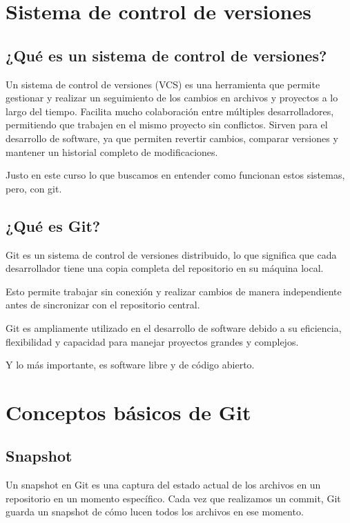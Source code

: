 \documentclass[12pt, letterpaper]{article}
\begin{document}
\section*{Sistema de control de versiones}

\subsection*{¿Qué es un sistema de control de versiones?}

Un sistema de control de versiones (VCS) es una herramienta que permite gestionar y realizar un seguimiento de los cambios en archivos y proyectos a lo largo del tiempo. Facilita mucho colaboración entre múltiples desarrolladores, permitiendo que trabajen en el mismo proyecto sin conflictos. Sirven para el desarrollo de software, ya que permiten revertir cambios, comparar versiones y mantener un historial completo de modificaciones.

Justo en este curso lo que buscamos en entender como funcionan estos sistemas, pero, con git.

\subsection*{¿Qué es Git?}
Git es un sistema de control de versiones distribuido, lo que significa que cada desarrollador tiene una copia completa del repositorio en su máquina local.

Esto permite trabajar sin conexión y realizar cambios de manera independiente antes de sincronizar con el repositorio central.

Git es ampliamente utilizado en el desarrollo de software debido a su eficiencia, flexibilidad y capacidad para manejar proyectos grandes y complejos.

Y lo más importante, es software libre y de código abierto.

\section*{Conceptos básicos de Git}

\subsection*{Snapshot}
Un snapshot en Git es una captura del estado actual de los archivos en un repositorio en un momento específico. Cada vez que realizamos un commit, Git guarda un snapshot de cómo lucen todos los archivos en ese momento. 
\end{document}
